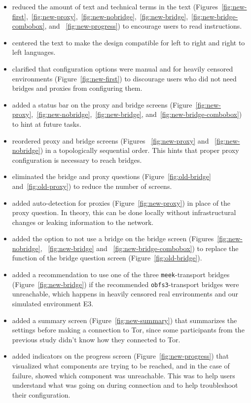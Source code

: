 \documentclass[USenglish,oneside,twocolumn]{article}
\begin{document}
\begin{itemize}
\item{reduced the amount of text and technical terms in the text (Figures~\ref{fig:new-first},~\ref{fig:new-proxy},~\ref{fig:new-nobridge},~\ref{fig:new-bridge},~\ref{fig:new-bridge-combobox}, and ~\ref{fig:new-progress})  to encourage users to read instructions.} 
\item{centered the text to make the design compatible for left to right and right to left languages.}
\item{clarified that configuration options were manual and for heavily censored environments (Figure~\ref{fig:new-first}) to discourage users who did not need bridges and proxies from configuring them.}
\item{added a status bar on the proxy and bridge screens (Figure~\ref{fig:new-proxy},~\ref{fig:new-nobridge},~\ref{fig:new-bridge}, and~\ref{fig:new-bridge-combobox}) to hint at future tasks.}
\item{reordered proxy and bridge screens (Figures ~\ref{fig:new-proxy} and ~\ref{fig:new-nobridge}) in a topologically sequential order. This hints that proper proxy configuration is necessary to reach bridges.}
\item{eliminated the bridge and proxy questions (Figure~\ref{fig:old-bridge} and~\ref{fig:old-proxy}) to reduce the number of screens.}
\item{added auto-detection for proxies (Figure~\ref{fig:new-proxy}) in place of the proxy question. In theory, this can be done locally without infrastructural changes or leaking information to the network.}
\item{added the option to not use a bridge on the bridge screen (Figures~\ref{fig:new-nobridge}, ~\ref{fig:new-bridge} and ~\ref{fig:new-bridge-combobox}) to replace the function of the bridge question screen (Figure~\ref{fig:old-bridge}).}
\item{added a recommendation to use one of the three \texttt{meek}-transport bridges (Figure~\ref{fig:new-bridge}) if the recommended \texttt{obfs3}-transport bridges were unreachable, which happens in heavily censored real environments and our simulated environment E3.}
\item{added a summary screen (Figure~\ref{fig:new-summary}) that summarizes the settings before making a connection to Tor, since some participants from the previous study didn't know how they connected to Tor.}
\item{added indicators on the progress screen (Figure~\ref{fig:new-progress}) that visualized what components are trying to be reached, and in the case of failure, showed which component was unreachable. This was to help users understand what was going on during  connection and to help troubleshoot their configuration.}
\end{itemize} 
\end{document}

